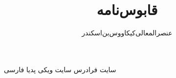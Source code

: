 \documentclass[12pt,onecolumn,a4paper]{article}
\begin{document}
\title{قابوس‌نامه} 
\author{عنصرالمعالی‌کیکاووس‌بن‌اسکندر}
\date{}
\maketitle
\newpage





\newpage
\tableofcontents
\newpage








































% 
% 
% 




\begin{thebibliography}{99}
\bibitem{}
سایت فرادرس
\bibitem{}
سایت ویکی پدیا فارسی




\end{thebibliography}
\end{document}
